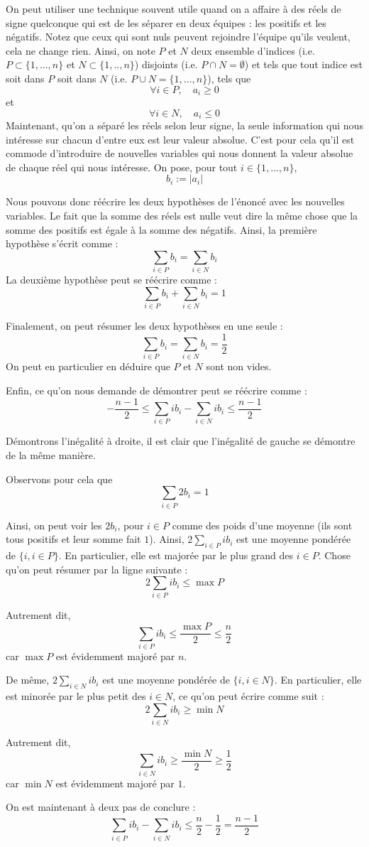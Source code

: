 \begin{sol}
On peut utiliser une technique souvent utile quand on a affaire à des réels de signe quelconque qui est de les séparer en deux équipes : les positifs et les négatifs. Notez que ceux qui sont nuls peuvent rejoindre l'équipe qu'ils veulent, cela ne change rien. Ainsi, on note $P$ et $N$ deux ensemble d'indices (i.e. $P \subset \{1,\dots,n\}$ et $N \subset \{1,..,n\}$) disjoints (i.e. $P \cap N = \emptyset$) et tels que tout indice est soit dans $P$ soit dans $N$ (i.e. $P \cup N =\{1,\dots,n\}$), tels que
$$\forall i \in P, \quad a_i \ge 0$$
et
$$\forall i \in N, \quad a_i \le 0$$
Maintenant, qu'on a séparé les réels selon leur signe, la seule information qui nous intéresse sur chacun d'entre eux est leur valeur absolue. C'est pour cela qu'il est commode d'introduire de nouvelles variables qui nous donnent la valeur absolue de chaque réel qui nous intéresse. On pose, pour tout $i \in \{1,\dots,n\}$,
$$b_i := \vert a_i \vert$$

Nous pouvons donc réécrire les deux hypothèses de l'énoncé avec les nouvelles variables. Le fait que la somme des réels est nulle veut dire la même chose que la somme des positifs est égale à la somme des négatifs. Ainsi, la première hypothèse s'écrit comme :
$$\sum_{i \in P} b_i = \sum_{i \in N} b_i$$
La deuxième hypothèse peut se réécrire comme :
$$\sum_{i \in P} b_i + \sum_{i \in N} b_i =1$$

Finalement, on peut résumer les deux hypothèses en une seule :
$$\sum_{i \in P} b_i = \sum_{i \in N} b_i = \frac12$$
On peut en particulier en déduire que $P$ et $N$ sont non vides.

Enfin, ce qu'on nous demande de démontrer peut se réécrire comme :
$$-\frac{n-1}2 \le \sum_{i \in P} ib_i - \sum_{i \in N} ib_i \le \frac{n-1}2$$

Démontrons l'inégalité à droite, il est clair que l'inégalité de gauche se démontre de la même manière.

Observons pour cela que
$$\sum_{i \in P} 2b_i = 1$$

Ainsi, on peut voir les $2b_i$, pour $i \in P$ comme des poids d'une moyenne (ils sont tous positifs et leur somme fait $1$). Ainsi, $2\sum_{i \in P} ib_i$ est une moyenne pondérée de $\{i,i \in P\}$. En particulier, elle est majorée par le plus grand des $i \in P$. Chose qu'on peut résumer par la ligne suivante :
$$2\sum_{i \in P} ib_i \le \max P$$

Autrement dit,
$$\sum_{i \in P} ib_i \le \frac{\max P}2 \le \frac{n}2$$
car $\max P$ est évidemment majoré par $n$.

De même, $2 \sum_{i \in N} ib_i$ est une moyenne pondérée de $\{i,i \in N\}$. En particulier, elle est minorée par le plus petit des $i \in N$, ce qu'on peut écrire comme suit :
$$2\sum_{i \in N} ib_i \ge \min N$$

Autrement dit,
$$\sum_{i \in N} ib_i \ge \frac{\min N}2 \ge \frac12$$
car $\min N$ est évidemment majoré par $1$.

On est maintenant à deux pas de conclure :
$$\sum_{i \in P} ib_i - \sum_{i \in N} ib_i \le \frac{n}2 - \frac12 = \frac{n-1}2$$
\end{sol}

